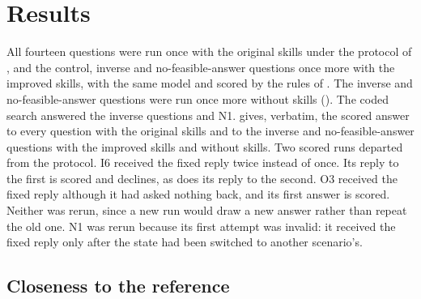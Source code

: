  \section{Results}
  \label{sec:results}

  All fourteen questions were run once with the original skills under the protocol of
  , and the control, inverse and no-feasible-answer questions once more with the
  improved skills, with the same model and scored by the rules of . The inverse
  and no-feasible-answer questions were run once more without skills (). The
  coded search answered the inverse questions and N1.  gives, verbatim, the scored
  answer to every question with the original skills and to the inverse and no-feasible-answer
  questions with the improved skills and without skills. Two scored runs departed from the protocol. I6
  received the fixed reply twice instead of once. Its reply to the first is scored and
  declines, as does its reply to the second. O3 received the fixed reply although it had asked
  nothing back, and its first answer is scored. Neither was rerun, since a new run would draw a
  new answer rather than repeat the old one. N1 was rerun because its first attempt was invalid: it received the fixed reply only after the
  state had been switched to another scenario's.

  \subsection{Closeness to the reference}
  \label{sec:results-closeness}

